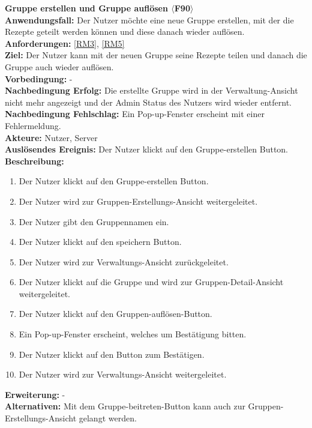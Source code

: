 \documentclass[parskip=full]{scrartcl}
\begin{document}
\textbf{Gruppe erstellen und Gruppe auflösen $\langle$F90$\rangle$}\\
\textbf{Anwendungsfall:} Der Nutzer möchte eine neue Gruppe erstellen, mit der die Rezepte geteilt werden können und diese danach wieder auflösen.\\
\textbf{Anforderungen:} \ref{RM3}, \ref{RM5} \\
\textbf{Ziel:} Der Nutzer kann mit der neuen Gruppe seine Rezepte teilen und danach die Gruppe auch wieder auflösen.\\
\textbf{Vorbedingung:} -\\
\textbf{Nachbedingung Erfolg:} Die erstellte Gruppe wird in der Verwaltung-Ansicht nicht mehr angezeigt und der Admin Status des Nutzers wird wieder entfernt.\\
\textbf{Nachbedingung Fehlschlag:} Ein Pop-up-Fenster erscheint mit einer Fehlermeldung.\\
\textbf{Akteure:} Nutzer, Server\\
\textbf{Auslösendes Ereignis:} Der Nutzer klickt auf den Gruppe-erstellen Button.\\
\textbf{Beschreibung:}
\begin{enumerate}
    \item Der Nutzer klickt auf den Gruppe-erstellen Button.
    \item Der Nutzer wird zur Gruppen-Erstellungs-Ansicht weitergeleitet.
    \item Der Nutzer gibt den Gruppennamen ein.
    \item Der Nutzer klickt auf den speichern Button.
    \item Der Nutzer wird zur Verwaltungs-Ansicht zurückgeleitet.
    \item Der Nutzer klickt auf die Gruppe und wird zur Gruppen-Detail-Ansicht weitergeleitet.
    \item Der Nutzer klickt auf den Gruppen-auflösen-Button.
    \item Ein Pop-up-Fenster erscheint, welches um Bestätigung bitten.
    \item Der Nutzer klickt auf den Button zum Bestätigen.
    \item Der Nutzer wird zur Verwaltungs-Ansicht weitergeleitet.
\end{enumerate}
\textbf{Erweiterung:} -\\
\textbf{Alternativen:} Mit dem Gruppe-beitreten-Button kann auch zur Gruppen-Erstellungs-Ansicht gelangt werden.
\newpage
\end{document}
